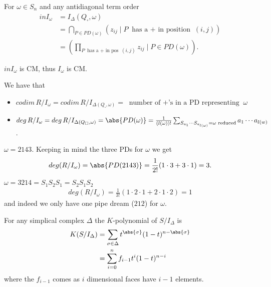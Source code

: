\begin{theorem}
    For $\omega \in S_n$ and any antidiagonal term order
    \begin{align*}
        in I_\omega &= I_\Delta (Q_\square, \omega)\\
        &= \bigcap_{P \in PD(\omega)} ( z_{ij} \mid P \text{ has a $+$ in position } (i,j) )\\
        &= ( \prod_{P \text{ has a $+$ in pos } (i,j)} z_{ij} \mid P \in PD(\omega) ).
    \end{align*}
\end{theorem}

\begin{corollary}
    $in I_\omega $ is CM, thus $I_\omega$ is CM.
\end{corollary}

\begin{corollary}
    We have that
    \begin{itemize}
        \item $codim\, R/ I_\omega = codim\, R/ I_{\Delta (Q_\square, \omega )} = \text{ number of $+$'s in a PD representing } \omega$
        \item $deg \,R / I_\omega  = deg \, R/ I_{\Delta (Q_\square , \omega) } = \abs{ PD(\omega)} = \frac{1}{(l(\omega ))!} \sum_{S_{a_{1}} \cdots S_{a_{l(\omega)} } = \omega \text{ reduced} } a_1 \cdots a_{l(w)} $.
    \end{itemize}
\end{corollary}

\begin{example}
    $\omega = 2143$. Keeping in mind the three PDs for $\omega$ we get
    \begin{align*}
        deg( R/ I_\omega ) = \abs{ PD(2143) } = \frac{1}{2!} ( 1 \cdot 3 + 3 \cdot 1 ) = 3.
    \end{align*}
\end{example}

\begin{example}
    $\omega = 3214 = S_1 S_2 S_1 = S_2 S_1 S_2$
    \begin{align*}
        deg( R/ I_\omega ) = \frac{1}{3!} (1 \cdot 2 \cdot 1 + 2 \cdot 1 \cdot 2 ) = 1
    \end{align*}
    and indeed we only have one pipe dream ($212$) for $\omega$.
\end{example}

\begin{theorem}
    For any simplical complex $\Delta$ the $K$-polynomial of $S / I_\Delta $ is 
    \begin{align*}
        K(S / I_\Delta ) &= \sum_{\sigma \in \Delta } t^{\abs{\sigma } } (1-t)^{n - \abs{\sigma}}\\
        &= \sum_{i=0 }^n f_{i-1} t^i (1-t)^{n-i}
    \end{align*}
    where the $f_{i-1}$ comes as $i$ dimensional faces have $i-1$ elements.
\end{theorem}

